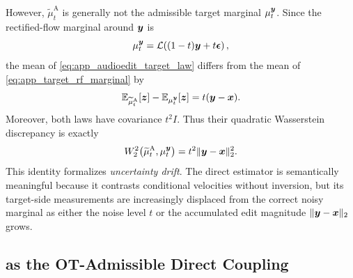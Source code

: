 However, $\widetilde{\mu}^{\mathrm{A}}_t$ is generally not the admissible target marginal $\mu_t^{\boldsymbol{y}}$.
Since the rectified-flow marginal around $\boldsymbol{y}$ is
\begin{equation}
    \label{eq:app_target_rf_marginal}
    \mu_t^{\boldsymbol{y}}
    =
    \mathcal{L}\!\left((1-t)\boldsymbol{y}+t\boldsymbol{\epsilon}\right),
\end{equation}
the mean of \eqref{eq:app_audioedit_target_law} differs from the mean of \eqref{eq:app_target_rf_marginal} by
\begin{equation}
    \label{eq:app_audioedit_mean_bias}
    \mathbb{E}_{\widetilde{\mu}^{\mathrm{A}}_t}[\boldsymbol{z}]
    -
    \mathbb{E}_{\mu_t^{\boldsymbol{y}}}[\boldsymbol{z}]
    =
    t(\boldsymbol{y}-\boldsymbol{x}).
\end{equation}
Moreover, both laws have covariance $t^2I$.
Thus their quadratic Wasserstein discrepancy is exactly
\begin{equation}
    \label{eq:app_audioedit_w2_bias}
    W_2^2\!\left(
    \widetilde{\mu}^{\mathrm{A}}_t,
    \mu_t^{\boldsymbol{y}}
    \right)
    =
    t^2\|\boldsymbol{y}-\boldsymbol{x}\|_2^2.
\end{equation}
This identity formalizes \emph{uncertainty drift}.
The direct estimator is semantically meaningful because it contrasts conditional velocities without inversion, but its target-side measurements are increasingly displaced from the correct noisy marginal as either the noise level $t$ or the accumulated edit magnitude $\|\boldsymbol{y}-\boldsymbol{x}\|_2$ grows.

\subsection{\methodplus as the OT-Admissible Direct Coupling}

